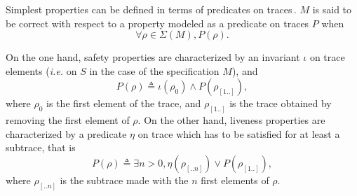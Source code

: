 Simplest properties can be defined in terms of predicates on
traces\,\cite{alpern1987recognizing,schneider2000enforceable,basin2013enforceable}.
%
\( M \) is said to be correct with respect to a property modeled as a predicate
on traces \( P \) when
%
\[
  \forall \rho \in \Sigma(M), P(\rho).
\]

On the one hand, safety properties are characterized by an invariant \( \iota \)
on trace elements (\emph{i.e.} on \( S \) in the case of the specification
\( M \)), and
%
\[
  P(\rho) \triangleq \iota(\rho_0) \wedge P(\rho_{[1..]}),
\]
%
where \( \rho_0 \) is the first element of the trace, and \( \rho_{[1..]} \) is
the trace obtained by removing the first element of \( \rho \).
%
On the other hand, liveness properties are characterized by a predicate
\( \eta \) on trace which has to be satisfied for at least a subtrace, that is
%
\[
  P(\rho) \triangleq \exists n > 0, \eta(\rho_{[..n]}) \vee P(\rho_{[1..]}),
\]
%
where \( \rho_{[..n]} \) is the subtrace made with the \( n \) first elements of
\( \rho \).

